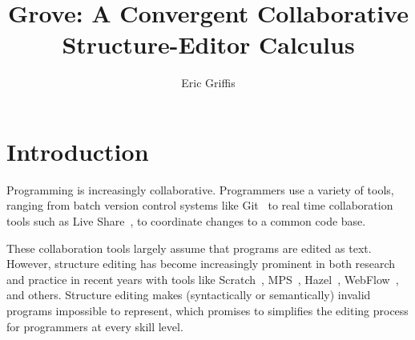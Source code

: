 \documentclass[nonacm, acmsmall, screen, review]{acmart}
\begin{document}
\title[Grove]{Grove: A Convergent Collaborative Structure-Editor Calculus}


\author{Eric Griffis}


\maketitle



\section{Introduction}


Programming is increasingly collaborative.
Programmers use a variety of tools, ranging from batch version control systems like Git~\cite{chacon_pro_2014} to real time collaboration tools such as Live Share~\cite{noauthor_use_nodate}, to coordinate changes to a common code base.

These collaboration tools largely assume that programs are edited as text.
However, structure editing has become increasingly prominent in both research and practice in recent years with tools like 
Scratch~\cite{resnick_scratch_2009}, 
MPS~\cite{voelter_language_2011}, 
Hazel~\cite{omar_hazelnut_2017}, 
WebFlow~\cite{noauthor_webflow_nodate},
and others.
Structure editing makes (syntactically or semantically) invalid programs impossible to represent, which promises to simplifies the editing process for programmers at every skill level.
\end{document}
